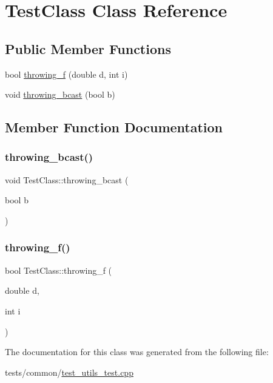 \hypertarget{classTestClass}{}\section{Test\+Class Class Reference}
\label{classTestClass}
\subsection*{Public Member Functions}
\begin{DoxyCompactItemize}
\item 
bool \hyperlink{classTestClass_ac2c00cf21806a2ba96d8b1d77118ce4a}{throwing\+\_\+f} (double d, int i)
\item 
void \hyperlink{classTestClass_a674770dde13ce8a86c0d883fc6a92b7c}{throwing\+\_\+bcast} (bool b)
\end{DoxyCompactItemize}


\subsection{Member Function Documentation}
\mbox{\label{classTestClass_a674770dde13ce8a86c0d883fc6a92b7c}} 
\subsubsection{\texorpdfstring{throwing\+\_\+bcast()}{throwing\_bcast()}}
{\footnotesize\ttfamily void Test\+Class\+::throwing\+\_\+bcast (\begin{DoxyParamCaption}\item[{bool}]{b }\end{DoxyParamCaption})\hspace{0.3cm}{\ttfamily [inline]}}

\mbox{\label{classTestClass_ac2c00cf21806a2ba96d8b1d77118ce4a}} 
\subsubsection{\texorpdfstring{throwing\+\_\+f()}{throwing\_f()}}
{\footnotesize\ttfamily bool Test\+Class\+::throwing\+\_\+f (\begin{DoxyParamCaption}\item[{double}]{d,  }\item[{int}]{i }\end{DoxyParamCaption})\hspace{0.3cm}{\ttfamily [inline]}}



The documentation for this class was generated from the following file\+:\begin{DoxyCompactItemize}
\item 
tests/common/\hyperlink{test__utils__test_8cpp}{test\+\_\+utils\+\_\+test.\+cpp}\end{DoxyCompactItemize}
